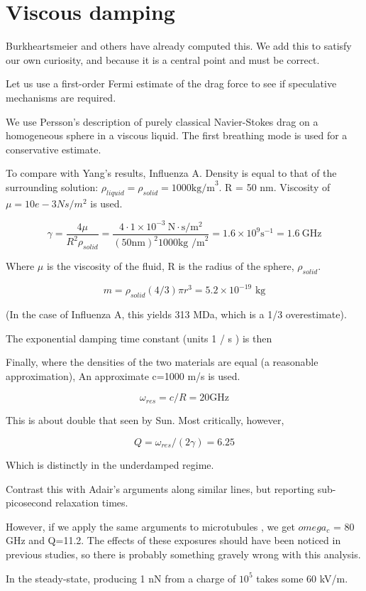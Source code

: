 \documentclass[paper.tex]{subfiles}
\begin{document}
\section{Viscous damping}
\label{sec:viscousdamping}


\begin{autem}
	Burkheartsmeier and others have already computed this. We add this to satisfy our own curiosity, and because it is a central point and must be correct.
\end{autem}


Let us use a first-order Fermi estimate of the drag force to see if speculative mechanisms are required.

We use Persson's description of purely classical Navier-Stokes drag \cite{nature1986} on a homogeneous sphere in a viscous liquid. The first breathing mode is used for a conservative estimate.

To compare with Yang's results, Influenza A. Density is equal to that of the surrounding solution: $\rho_{liquid} = \rho_{solid} = 1000 \text{kg/m}^3$. R = 50 nm. Viscosity of $\mu=10e-3 Ns/m^2$ is used.

$$ \gamma = \frac{4\mu}{R^2 \rho_{solid}} = \frac{4 \cdot 1\times 10^{-3}\  \text{N}\cdot \text{s} / \text{m}^2 }{(50 \text{nm})^2 1000 \text{kg /m}^2} = 1.6 \times 10^9 \text{s}^{-1} = 1.6\ \text{GHz}$$

Where $\mu$ is the viscosity of the fluid, R is the radius of the sphere, $\rho_{solid}$. \footnotemark \footnotemark



$$m = \rho_{solid}  (4/3) \pi r^3 = 5.2 \times 10^{-19} \text{ kg} $$

(In the case of Influenza A, this yields 313 MDa, which is a 1/3 overestimate). 

The exponential damping time constant (units 1 / s ) is then

Finally, where the densities of the two materials are equal (a reasonable approximation), An approximate c=1000 m/s is used. 

$$ \omega_{res} = c / R = 20 \text{GHz}$$

This is about double that seen by Sun. Most critically, however,

$$ Q = \omega_{res}/(2\gamma) = 6.25 $$

Which is distinctly in the underdamped regime.

Contrast this with Adair's arguments along similar lines, but reporting sub-picosecond relaxation times.

However, if we apply the same arguments to microtubules \cite{Viscous2000}, we get $omega_c$ = 80 GHz and Q=11.2. The effects of these exposures should have been noticed in previous studies, so there is probably something gravely wrong with this analysis.


In the steady-state, producing 1 nN from a charge of $10^5$ takes some 60 kV/m. 
\end{document}
